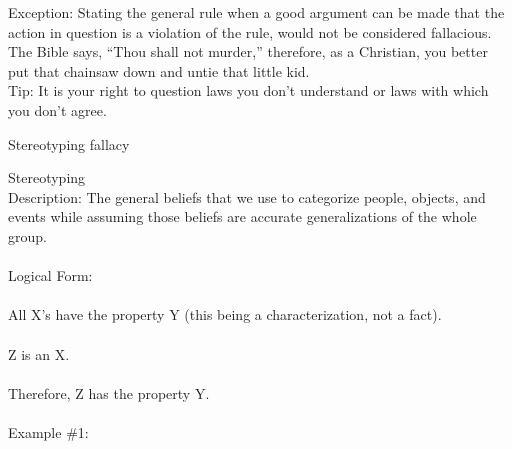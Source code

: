 \documentclass[a4paper,12pt,single,pdftex]{scrartcl}
\begin{document}
{    
      Exception: Stating the general rule when a good argument can be made that the action in question is a violation of the rule, would not be considered fallacious.
    \\

    
      The Bible says, “Thou shall not murder,” therefore, as a Christian, you better put that chainsaw down and untie that little kid.
    \\

    
      Tip: It is your right to question laws you don’t understand or laws with which you don’t agree. 
    \\

  }


Stereotyping fallacy
    
      Stereotyping
    \\

    
      Description: The general beliefs that we use to categorize people, objects, and events while assuming those beliefs are accurate generalizations of the whole group.
    \\

    
      
    \\

    
      Logical Form:
    \\

    
      
    \\

    
      All X’s have the property Y (this being a characterization, not a fact).
    \\

    
      
    \\

    
      Z  is an X.
    \\

    
      
    \\

    
      Therefore, Z has the property Y.
    \\

    
      
    \\

    
      Example \#1:
    \\

    
      
    \\
\end{document}
